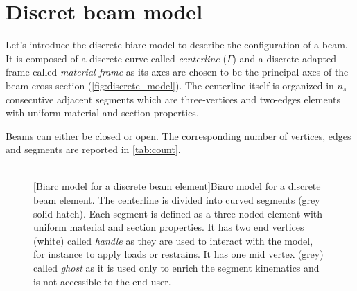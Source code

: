 \section{Discret beam model}
Let's introduce the discrete biarc model to describe the configuration of a beam. It is composed of a discrete curve called \emph{centerline} ($\Gamma$) and a discrete adapted frame called \emph{material frame} as its axes are chosen to be the principal axes of the beam cross-section (\cref{fig:discrete_model}). The centerline itself is organized in $n_s$ consecutive adjacent segments which are three-vertices and two-edges elements with uniform material and section properties.

Beams can either be closed or open. The corresponding number of vertices, edges and segments are reported in \cref{tab:count}.
\begin{figure}[p]
\begin{fullpage}
	\captionsetup[subfloat]{captionskip=20pt}
     	\centering
     	 \\
	\vspace{30pt}
	\vspace{10pt}
	[Biarc model for a discrete beam element]{Biarc model for a discrete beam element. The centerline is divided into curved segments (grey solid hatch). Each segment is defined as a three-noded element with uniform material and section properties. It has two end vertices (white) called \emph{handle} as they are used to interact with the model, for instance to apply loads or restrains. It has one mid vertex (grey) called \emph{ghost} as it is used only to enrich the segment kinematics and is not accessible to the end user.}
\end{fullpage}
\end{figure}

